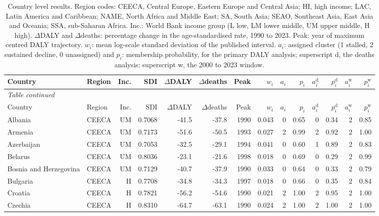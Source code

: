 \begin{longtable}{llrrrrrrrrrrrr}
\caption{Country level results. Region codes: CEECA, Central Europe, Eastern Europe and Central Asia; HI, high income; LAC, Latin America and Caribbean; NAME, North Africa and Middle East; SA, South Asia; SEAO, Southeast Asia, East Asia and Oceania; SSA, sub-Saharan Africa. Inc.: World Bank income group (L low, LM lower middle, UM upper middle, H high). $\Delta$DALY and $\Delta$deaths: percentage change in the age-standardised rate, 1990 to 2023. Peak: year of maximum centred DALY trajectory. $w_i$: mean log-scale standard deviation of the published interval. $a_i$: assigned cluster (1 stalled, 2 sustained decline, 0 unassigned) and $p_i$: membership probability, for the primary DALY analysis; superscript d, the deaths analysis; superscript w, the 2000 to 2023 window.}\label{S1}\\
\toprule
Country & Region & Inc. & SDI & $\Delta$DALY & $\Delta$deaths & Peak & $w_i$ & $a_i$ & $p_i$ & $a_i^{\mathrm{d}}$ & $p_i^{\mathrm{d}}$ & $a_i^{\mathrm{w}}$ & $p_i^{\mathrm{w}}$ \\
\midrule
\endfirsthead
\multicolumn{14}{l}{\small\textit{Table \thetable{} continued}}\\
\toprule
Country & Region & Inc. & SDI & $\Delta$DALY & $\Delta$deaths & Peak & $w_i$ & $a_i$ & $p_i$ & $a_i^{\mathrm{d}}$ & $p_i^{\mathrm{d}}$ & $a_i^{\mathrm{w}}$ & $p_i^{\mathrm{w}}$ \\
\midrule
\endhead
\bottomrule
\endfoot
Albania & CEECA & UM & 0.7068 & -41.5 & -37.8 & 1990 & 0.043 & 0 & 0.65 & 0 & 0.34 & 2 & 0.85 \\
Armenia & CEECA & UM & 0.7173 & -51.6 & -50.5 & 1993 & 0.027 & 2 & 0.99 & 2 & 0.92 & 2 & 1.00 \\
Azerbaijan & CEECA & UM & 0.7053 & -32.5 & -29.1 & 1994 & 0.041 & 0 & 0.60 & 1 & 0.89 & 2 & 0.83 \\
Belarus & CEECA & UM & 0.8036 & -23.1 & -21.6 & 1998 & 0.018 & 0 & 0.69 & 0 & 0.29 & 2 & 0.99 \\
Bosnia and Herzegovina & CEECA & UM & 0.7129 & -40.7 & -37.9 & 1990 & 0.033 & 0 & 0.64 & 0 & 0.33 & 2 & 0.79 \\
Bulgaria & CEECA & H & 0.7708 & -34.8 & -34.3 & 1997 & 0.018 & 0 & 0.66 & 0 & 0.35 & 2 & 0.84 \\
Croatia & CEECA & H & 0.7821 & -56.2 & -54.6 & 1990 & 0.021 & 2 & 1.00 & 2 & 0.95 & 2 & 1.00 \\
Czechia & CEECA & H & 0.8310 & -64.7 & -63.1 & 1990 & 0.024 & 2 & 1.00 & 2 & 1.00 & 2 & 1.00 \\

\end{longtable}
